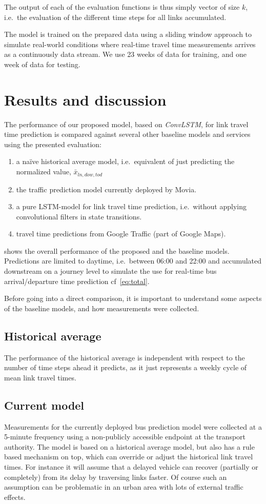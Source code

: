 ﻿\documentclass[preprint,11pt,5p,twocolumn]{elsarticle}
\begin{document}
The output of each of the evaluation functions is thus simply vector of size $k$, i.e.\ the evaluation of the different time steps for all links accumulated.

The model is trained on the prepared data using a sliding window approach to simulate real-world conditions where real-time travel time measurements arrives as a continuously data stream. We use 23 weeks of data for training, and one week of data for testing.

\section{Results and discussion}
\label{sec:results}
The performance of our proposed model, based on \emph{ConvLSTM}, for link travel time prediction is compared against several other baseline models and services using the presented evaluation:
\begin{enumerate}
   \item a naïve historical average model, i.e.\ equivalent of just predicting the normalized value, $\bar{x}_{\mathit{ln},\mathit{dow},\mathit{tod}}$ 
   \item the traffic prediction model currently deployed by Movia.
   \item a pure LSTM-model for link travel time prediction, i.e.\ without applying convolutional filters in state transitions.
   \item travel time predictions from Google Traffic (part of Google Maps).
\end{enumerate}

 shows the overall performance of the proposed and the baseline models. Predictions are limited to daytime, i.e.\ between 06:00 and 22:00 and accumulated downstream on a journey level to simulate the use for real-time bus arrival/departure time prediction cf~\cref{eq:total}. 

Before going into a direct comparison, it is important to understand some aspects of the baseline models, and how measurements were collected.

\subsection{Historical average}
The performance of the historical average is independent with respect to the number of time steps ahead it predicts, as it just represents a weekly cycle of mean link travel times.

\subsection{Current model}
Measurements for the currently deployed bus prediction model were collected at a 5-minute frequency using a non-publicly accessible endpoint at the transport authority. The model is based on a historical average model, but also has a rule based mechanism on top, which can override or adjust the historical link travel times. For instance it will assume that a delayed vehicle can recover (partially or completely) from its delay by traversing links faster. Of course such an assumption can be problematic in an urban area with lots of external traffic effects. 
\end{document}
